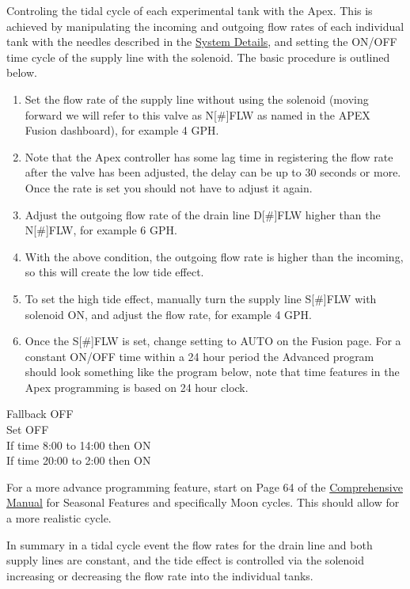 \documentclass[]{book}
\providecommand{\tightlist}{%
  \setlength{\itemsep}{0pt}\setlength{\parskip}{0pt}}
\begin{document}
Controling the tidal cycle of each experimental tank with the Apex. This
is achieved by manipulating the incoming and outgoing flow rates of each
individual tank with the needles described in the
\protect\hyperlink{system-details}{System Details}, and setting the
ON/OFF time cycle of the supply line with the solenoid. The basic
procedure is outlined below.

\begin{enumerate}
\def\labelenumi{\arabic{enumi}.}
\tightlist
\item
  Set the flow rate of the supply line without using the solenoid
  (moving forward we will refer to this valve as N{[}\#{]}FLW as named
  in the APEX Fusion dashboard), for example 4 GPH.
\item
  Note that the Apex controller has some lag time in registering the
  flow rate after the valve has been adjusted, the delay can be up to 30
  seconds or more. Once the rate is set you should not have to adjust it
  again.
\item
  Adjust the outgoing flow rate of the drain line D{[}\#{]}FLW higher
  than the N{[}\#{]}FLW, for example 6 GPH.
\item
  With the above condition, the outgoing flow rate is higher than the
  incoming, so this will create the low tide effect.
\item
  To set the high tide effect, manually turn the supply line
  S{[}\#{]}FLW with solenoid ON, and adjust the flow rate, for example 4
  GPH.
\item
  Once the S{[}\#{]}FLW is set, change setting to AUTO on the Fusion
  page. For a constant ON/OFF time within a 24 hour period the Advanced
  program should look something like the program below, note that time
  features in the Apex programming is based on 24 hour clock.
\end{enumerate}

Fallback OFF\\
Set OFF\\
If time 8:00 to 14:00 then ON\\
If time 20:00 to 2:00 then ON

For a more advance programming feature, start on Page 64 of the
\href{Manuals/Apex_Comprehensive_Reference_Manual.pdf}{Comprehensive
Manual} for Seasonal Features and specifically Moon cycles. This should
allow for a more realistic cycle.

In summary in a tidal cycle event the flow rates for the drain line and
both supply lines are constant, and the tide effect is controlled via
the solenoid increasing or decreasing the flow rate into the individual
tanks.
\end{document}
